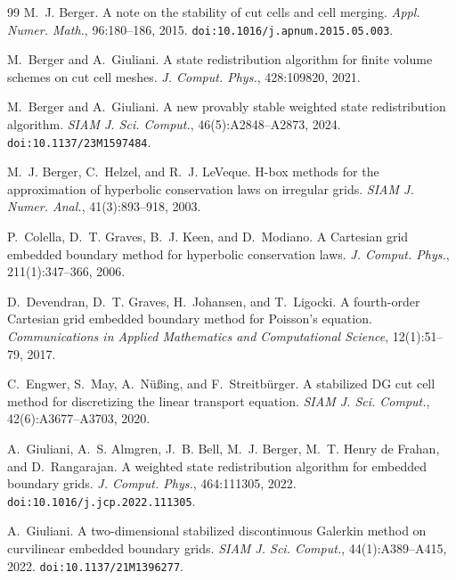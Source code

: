 \documentclass[preprint,12pt]{elsarticle}
\begin{document}
\clearpage
\begin{thebibliography}{99}
M.~J. Berger.
\newblock A note on the stability of cut cells and cell merging.
\newblock \emph{Appl. Numer. Math.}, 96:180--186, 2015.
\newblock \texttt{doi:10.1016/j.apnum.2015.05.003}.

M.~Berger and A.~Giuliani.
\newblock A state redistribution algorithm for finite volume schemes on cut
  cell meshes.
\newblock \emph{J. Comput. Phys.}, 428:109820, 2021.

M.~Berger and A.~Giuliani.
\newblock A new provably stable weighted state redistribution algorithm.
\newblock \emph{SIAM J. Sci. Comput.}, 46(5):A2848--A2873, 2024.
\newblock \texttt{doi:10.1137/23M1597484}.

M.~J. Berger, C.~Helzel, and R.~J. LeVeque.
\newblock H-box methods for the approximation of hyperbolic conservation laws
  on irregular grids.
\newblock \emph{SIAM J. Numer. Anal.}, 41(3):893--918, 2003.

P.~Colella, D.~T. Graves, B.~J. Keen, and D.~Modiano.
\newblock A Cartesian grid embedded boundary method for hyperbolic conservation
  laws.
\newblock \emph{J. Comput. Phys.}, 211(1):347--366, 2006.

D.~Devendran, D.~T. Graves, H.~Johansen, and T.~Ligocki.
\newblock A fourth-order {Cartesian} grid embedded boundary method for
  {Poisson's} equation.
\newblock \emph{Communications in Applied Mathematics and Computational
  Science}, 12(1):51--79, 2017.

C.~Engwer, S.~May, A.~N{\"u}{\ss}ing, and F.~Streitb{\"u}rger.
\newblock A stabilized {DG} cut cell method for discretizing the linear
  transport equation.
\newblock \emph{SIAM J. Sci. Comput.}, 42(6):A3677--A3703,
  2020.

A.~Giuliani, A.~S. Almgren, J.~B. Bell, M.~J. Berger,
M.~T. Henry de Frahan, and D.~Rangarajan.
\newblock A weighted state redistribution algorithm for embedded boundary grids.
\newblock \emph{J. Comput. Phys.}, 464:111305, 2022.
\newblock \texttt{doi:10.1016/j.jcp.2022.111305}.

A.~Giuliani.
\newblock A two-dimensional stabilized discontinuous {G}alerkin method on
  curvilinear embedded boundary grids.
\newblock \emph{SIAM J. Sci. Comput.}, 44(1):A389--A415, 2022.
\newblock \texttt{doi:10.1137/21M1396277}.


\end{thebibliography}
\end{document}
